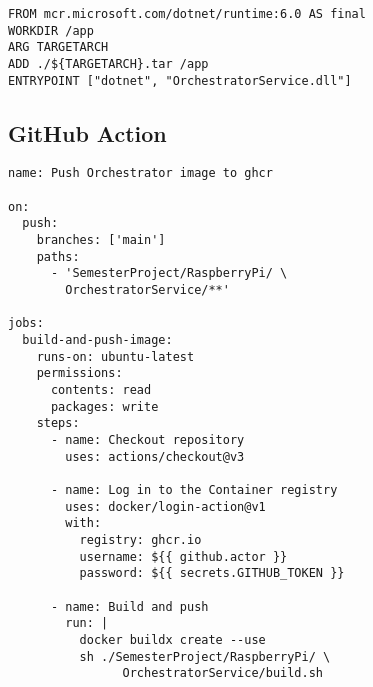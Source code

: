 \begin{verbatim}
FROM mcr.microsoft.com/dotnet/runtime:6.0 AS final
WORKDIR /app
ARG TARGETARCH
ADD ./${TARGETARCH}.tar /app
ENTRYPOINT ["dotnet", "OrchestratorService.dll"]
\end{verbatim}

\subsection{GitHub Action}

\begin{verbatim}
name: Push Orchestrator image to ghcr

on:
  push:
    branches: ['main']
    paths:
      - 'SemesterProject/RaspberryPi/ \
        OrchestratorService/**'

jobs:
  build-and-push-image:
    runs-on: ubuntu-latest
    permissions:
      contents: read
      packages: write
    steps:
      - name: Checkout repository
        uses: actions/checkout@v3

      - name: Log in to the Container registry
        uses: docker/login-action@v1
        with:
          registry: ghcr.io
          username: ${{ github.actor }}
          password: ${{ secrets.GITHUB_TOKEN }}

      - name: Build and push
        run: |
          docker buildx create --use
          sh ./SemesterProject/RaspberryPi/ \
                OrchestratorService/build.sh
\end{verbatim}
